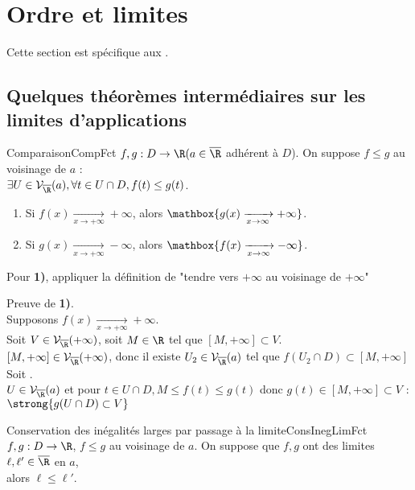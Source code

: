 \documentclass[12pt,a4paper]{report}
\begin{document}
\section{Ordre et limites}
Cette section est spécifique aux .

\subsection{Quelques théorèmes intermédiaires sur les limites d'applications}

\begin{theoreme}{Comparaison}{CompFct}
$f,g : D \to \R (a \in \overline{\R}$ adhérent à $D$). On suppose $f \leq g$ au voisinage de $a$ : \\
$\exists U \in \mathcal{V}_{\overline{\R}}(a), \forall t \in U \cap D, f(t) \leq g(t)$.
\begin{enumerate}
	\item Si $f(x) \xrightarrow[x \to +\infty]{} +\infty$, alors $\mathbox{g(x) \xrightarrow[x \to \infty]{} +\infty}$.
	\item Si $g(x) \xrightarrow[x \to +\infty]{} -\infty$, alors $\mathbox{f(x) \xrightarrow[x \to \infty]{} -\infty}$.
\end{enumerate}
\end{theoreme}

\begin{principedemo}{}
Pour \textbf{1)}, appliquer la définition de "tendre vers $+\infty$ au voisinage de $+\infty$" 
\end{principedemo}

\begin{demo}{}
Preuve de \textbf{1)}. \\
Supposons $f(x) \xrightarrow[x \to +\infty]{} +\infty$. \\
Soit $V \in \mathcal{V}_{\overline{\R}}(+\infty)$, soit $M \in \R$ tel que $[M, +\infty] \subset V$. \\
$[M,+\infty] \in \mathcal{V}_{\overline{\R}}(+\infty)$, donc il existe $U_2 \in \mathcal{V}_{\overline{\R}}(a)$ tel que $f(U_2 \cap D) \subset [M,+\infty]$ \\
Soit . \\
$U \in \mathcal{V}_{\overline{\R}}(a)$ et pour $t \in U \cap D, M \leq f(t) \leq g(t)$ donc $g(t) \in [M,+\infty] \subset V$ : $\strong{g(U \cap D) \subset V}$
\end{demo}

\begin{theoreme}{Conservation des inégalités larges par passage à la limite}{ConsInegLimFct}
$f,g : D \to \R$, $f \leq g$ au voisinage de $a$. On suppose que $f,g$ ont des limites $\ell,\ell' \in \overline{\R}$ en $a$, \\ 
alors $\ell \leq \ell'$.
\end{theoreme}
\end{document}
